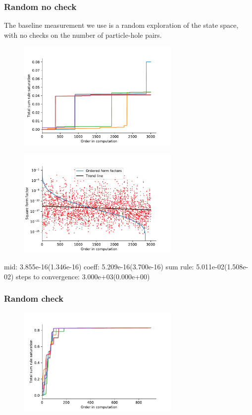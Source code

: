 \documentclass[11pt, a4paper]{report} %
\begin{document}
\subsubsection{Random no check}

The baseline measurement we use is a random exploration of the state space, with no checks on the number of particle-hole pairs.


\begin{figure}[tb!]
  \centering
  \includegraphics[width=0.7\textwidth]{saturation_history_rand_no_check.pdf}
\end{figure}

\begin{figure}[tb!]
  \centering
  \includegraphics[width=0.7\textwidth]{ffsizes_rand_no_check.pdf}
\end{figure}
mid: 3.855e-16(1.346e-16)
coeff: 5.209e-16(3.700e-16)
sum rule: 5.011e-02(1.508e-02)
steps to convergence: 3.000e+03(0.000e+00)

\subsubsection{Random check}

\begin{figure}[tb!]
  \centering
  \includegraphics[width=0.7\textwidth]{saturation_history_rand_check.pdf}
\end{figure}
\end{document}
